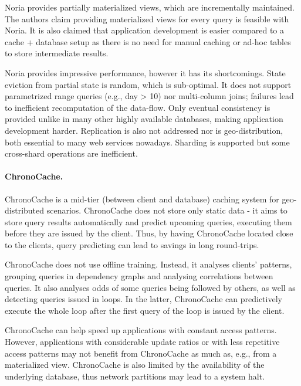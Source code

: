 Noria provides partially materialized views, which are incrementally maintained.
The authors claim providing materialized views for every query is feasible with Noria. It is also claimed that application development is easier compared to a cache + database setup as there is no need for manual caching or ad-hoc tables to store intermediate results.

Noria provides impressive performance, however it has its shortcomings.
State eviction from partial state is random, which is sub-optimal.
It does not support parametrized range queries (e.g., day > 10) nor multi-column joins; failures lead to inefficient recomputation of the data-flow.
Only eventual consistency is provided unlike in many other highly available databases, making application development harder.
Replication is also not addressed nor is geo-distribution, both essential to many web services nowadays.
Sharding is supported but some cross-shard operations are inefficient.

\paragraph{ChronoCache.} ChronoCache \cite{chronocache} is a mid-tier (between client and database) caching system for geo-distributed scenarios.
ChronoCache does not store only static data - it aims to store query results automatically and predict upcoming queries, executing them before they are issued by the client.
Thus, by having ChronoCache located close to the clients, query predicting can lead to savings in long round-trips.

ChronoCache does not use offline training.
Instead, it analyses clients' patterns, grouping queries in dependency graphs and analysing correlations between queries.
It also analyses odds of some queries being followed by others, as well as detecting queries issued in loops.
In the latter, ChronoCache can predictively execute the whole loop after the first query of the loop is issued by the client.

ChronoCache can help speed up applications with constant access patterns.
However, applications with considerable update ratios or with less repetitive access patterns may not benefit from ChronoCache as much as, e.g., from a materialized view.
ChronoCache is also limited by the availability of the underlying database, thus network partitions may lead to a system halt.

